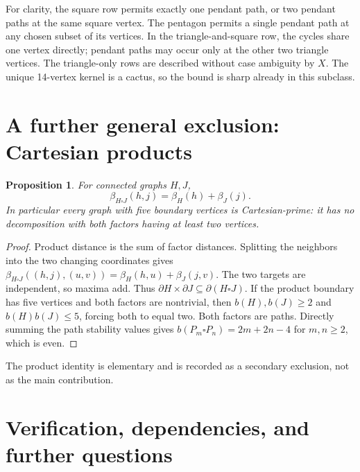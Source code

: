 \documentclass[11pt,a4paper]{article}
\newtheorem{proposition}[theorem]{Proposition}
\theoremstyle{definition}\newtheorem{definition}[theorem]{Definition}
\theoremstyle{remark}\newtheorem{remark}[theorem]{Remark}
\newcommand{\bd}{\partial}
\newcommand{\stab}{\beta}
\begin{document}
For clarity, the square row permits exactly one pendant path, or two pendant
paths at the same square vertex. The pentagon permits a single pendant path
at any chosen subset of its vertices. In the triangle-and-square row, the
cycles share one vertex directly; pendant paths may occur only at the other
two triangle vertices. The triangle-only rows are described without case
ambiguity by $X$. The unique 14-vertex kernel is a cactus, so the bound is
sharp already in this subclass.






\section{A further general exclusion: Cartesian products}
\begin{proposition}\label{prop:product}
For connected graphs $H,J$,
\[
 \stab_{H\square J}(h,j)=\stab_H(h)+\stab_J(j).
\]
In particular every graph with five boundary vertices is Cartesian-prime:
it has no decomposition with both factors having at least two vertices.
\end{proposition}
\begin{proof}
Product distance is the sum of factor distances. Splitting the neighbors into
the two changing coordinates gives
$\stab_{H\square J}((h,j),(u,v))=\stab_H(h,u)+\stab_J(j,v)$.
The two targets are independent, so maxima add. Thus
$\bd H\times\bd J\subseteq\bd(H\square J)$.
If the product boundary has five vertices and both factors are nontrivial,
then $b(H),b(J)\ge2$ and $b(H)b(J)\le5$, forcing both to equal two.
Both factors are paths. Directly summing the path stability values gives
$b(P_m\square P_n)=2m+2n-4$ for $m,n\ge2$, which is even.
\end{proof}
The product identity is elementary and is recorded as a secondary exclusion,
not as the main contribution.






\section{Verification, dependencies, and further questions}\label{sec:verification}
\end{document}

